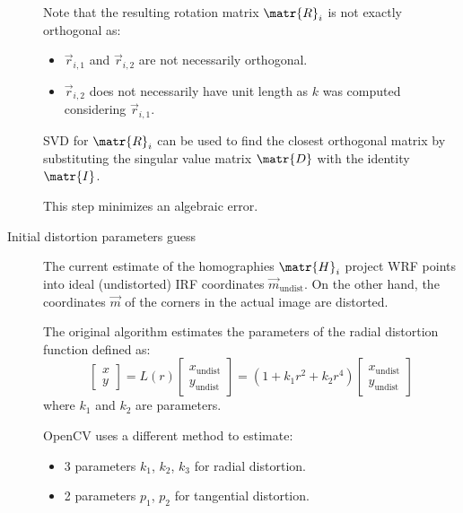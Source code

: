 \begin{description}
        Note that the resulting rotation matrix $\matr{R}_i$ is not exactly orthogonal as:
        \begin{itemize}
            \item $\vec{r}_{i,1}$ and $\vec{r}_{i,2}$ are not necessarily orthogonal.
            \item $\vec{r}_{i,2}$ does not necessarily have unit length as $k$ was computed considering $\vec{r}_{i,1}$.
        \end{itemize}
        SVD for $\matr{R}_i$ can be used to find the closest orthogonal matrix by substituting the singular value matrix $\matr{D}$ with the identity $\matr{I}$.

        \begin{remark}
            This step minimizes an algebraic error.
        \end{remark}

    \item[Initial distortion parameters guess]
        The current estimate of the homographies $\matr{H}_i$ project WRF points into ideal (undistorted) IRF coordinates $\vec{m}_\text{undist}$.
        On the other hand, the coordinates $\vec{m}$ of the corners in the actual image are distorted.

        The original algorithm estimates the parameters of the radial distortion function defined as:
        \[
            \begin{bmatrix} x \\ y \end{bmatrix} = L(r) \begin{bmatrix} x_\text{undist} \\ y_\text{undist} \end{bmatrix} =
                (1 + k_1r^2 + k_2r^4) \begin{bmatrix} x_\text{undist} \\ y_\text{undist} \end{bmatrix}
        \]
        where $k_1$ and $k_2$ are parameters.

        \begin{remark}
            OpenCV uses a different method to estimate:
            \begin{itemize}
                \item 3 parameters $k_1$, $k_2$, $k_3$ for radial distortion.
                \item 2 parameters $p_1$, $p_2$ for tangential distortion.
            \end{itemize}
        \end{remark}


\end{description}
